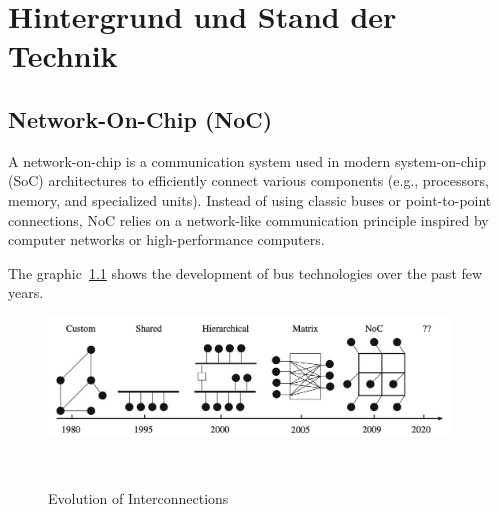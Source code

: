\chapter{Hintergrund und Stand der Technik}

\section{Network-On-Chip (NoC)}
A network-on-chip is a communication system used in modern system-on-chip (SoC) architectures to efficiently connect various components (e.g., processors, memory, and specialized units). Instead of using classic buses or point-to-point connections, NoC relies on a network-like communication principle inspired by computer networks or high-performance computers. 

The graphic~\ref{fig:Evolution_of_Interconnection} shows the development of bus technologies over the past few years.
\begin{figure}[htbp]
    \centering
    \includegraphics[width=0.95\textwidth]{img/Evolution of On-Chip communication interconnect.png}
    \caption{Evolution of Interconnections}~\cite{BenAbdallah2013}\label{fig:Evolution_of_Interconnection}
\end{figure}

